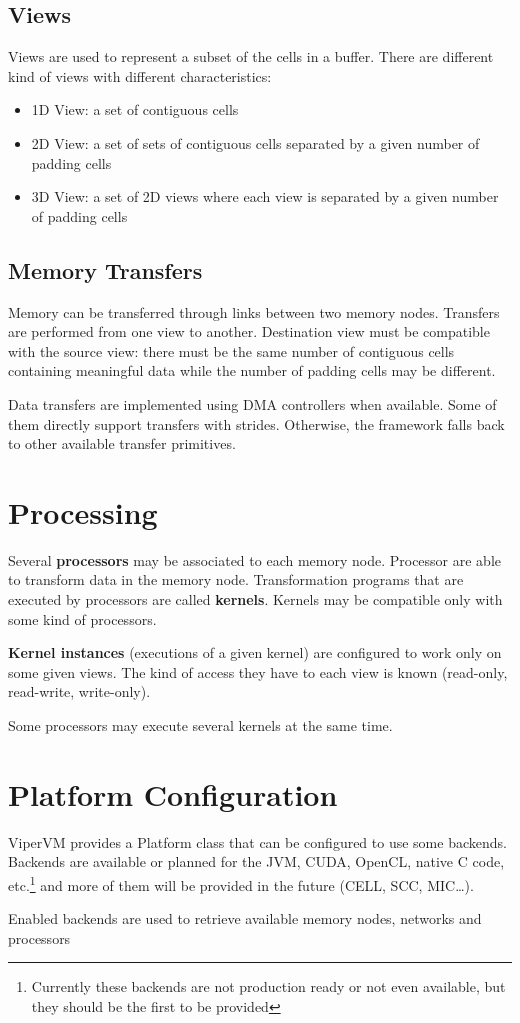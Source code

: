 \subsection{Views}
Views are used to represent a subset of the cells in a buffer. There are
different kind of views with different characteristics:
\begin{itemize}
  \item 1D View: a set of contiguous cells
  \item 2D View: a set of sets of contiguous cells separated by a given number
  of padding cells
  \item 3D View: a set of 2D views where each view is separated by a given
  number of padding cells
\end{itemize}

\subsection{Memory Transfers}
Memory can be transferred through links between two memory nodes. Transfers are
performed from one view to another. Destination view must be compatible with the
source view: there must be the same number of contiguous cells containing
meaningful data while the number of padding cells may be different.

Data transfers are implemented using DMA controllers when available. Some of
them directly support transfers with strides. Otherwise, the framework falls
back to other available transfer primitives.

\section{Processing}
Several \textbf{processors} may be associated to each memory node. Processor are able to
transform data in the memory node. Transformation programs that are executed by
processors are called \textbf{kernels}. Kernels may be compatible only with some
kind of processors.

\textbf{Kernel instances} (executions of a given kernel) are configured to work only on
some given views. The kind of access they have to each view is known (read-only,
read-write, write-only).

Some processors may execute several kernels at the same time.

\section{Platform Configuration}
ViperVM provides a Platform class that can be configured to use some backends.
Backends are available or planned for the JVM, CUDA, OpenCL, native C code,
etc.\footnote{Currently these backends are not production ready or not even
available, but they should be the first to be provided} and more of them will
be provided in the future (CELL, SCC, MIC\ldots).

Enabled backends are used to retrieve available memory nodes, networks and
processors
